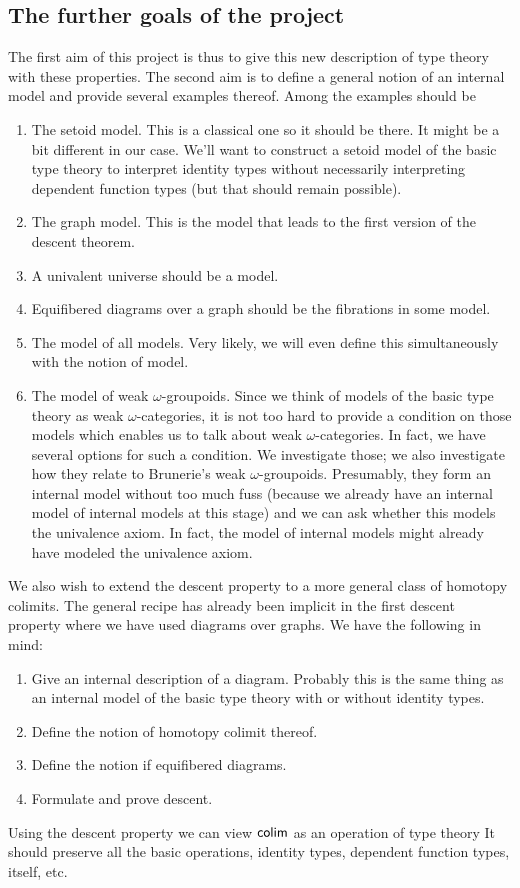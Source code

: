 \subsection{The further goals of the project}
The first aim of this project is thus to give this new description of type
theory with these properties. The second aim is to define a general notion of
an internal model and provide several examples thereof. Among the examples
should be
\begin{enumerate}
\item The setoid model. This is a classical one so it should be there. It might
      be a bit different in our case. We'll want to construct a setoid model
      of the basic type theory to interpret identity types without necessarily
      interpreting dependent function types (but that should remain possible).
\item The graph model. This is the model that leads to the first version of the
      descent theorem.
\item A univalent universe should be a model.
\item Equifibered diagrams over a graph should be the fibrations in some model.
\item The model of all models. Very likely, we will even define this simultaneously
      with the notion of model.
\item The model of weak $\omega$-groupoids. Since we think of models of the
      basic type theory as weak $\omega$-categories, it is not too hard to
      provide a condition on those models which enables us to talk about
      weak $\omega$-categories. In fact, we have several options for such a
      condition. We investigate those; we also investigate how they relate to
      Brunerie's weak $\omega$-groupoids. Presumably, they form an internal
      model without too much fuss (because we already have an internal model
      of internal models at this stage) and we can ask whether this models
      the univalence axiom. In fact, the model of internal models might already
      have modeled the univalence axiom. 
\end{enumerate}

We also wish to extend the descent property to a more general class of homotopy
colimits. The general recipe has already been implicit in the first descent
property where we have used diagrams over graphs. We have the following in mind:
\begin{enumerate}
\item Give an internal description of a diagram. Probably this is the same thing
      as an internal model of the basic type theory with or without identity types.
\item Define the notion of homotopy colimit thereof.
\item Define the notion if equifibered diagrams.
\item Formulate and prove descent.
\end{enumerate}

Using the descent property we can view $\mathsf{colim}$ as an operation of type theory
It should preserve all the basic operations, identity types, dependent function
types, itself, etc.
